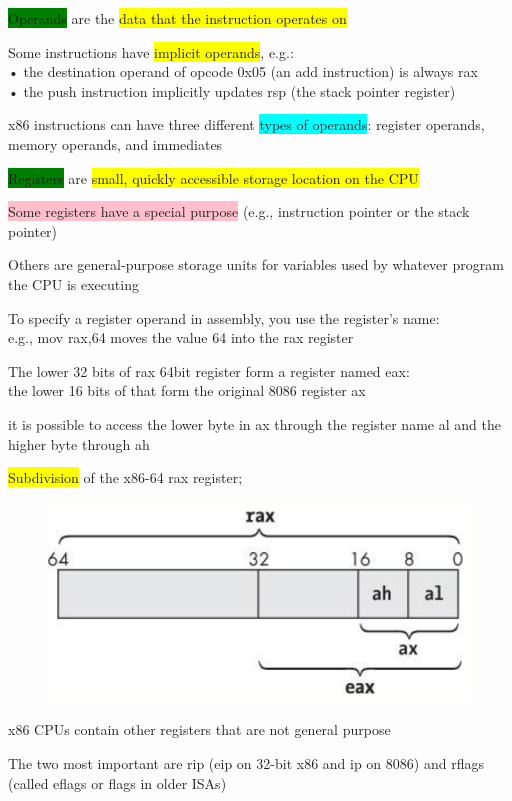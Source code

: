 \documentclass[]{project_plan}
\begin{document}
\colorbox{green}{Operands} are the \colorbox{yellow}{data that the instruction operates on}

Some instructions have \colorbox{yellow}{implicit operands}, e.g.:\\
• the destination operand of opcode 0x05 (an add instruction) is always rax\\
• the push instruction implicitly updates rsp (the stack pointer register)

x86 instructions can have three different \colorbox{cyan}{types of operands}: register operands, memory operands,
and immediates

\colorbox{green}{Registers} are \colorbox{yellow}{small, quickly accessible storage location on the CPU}

\colorbox{pink}{Some registers have a special purpose} (e.g., instruction pointer or the stack pointer)

Others are general-purpose storage units for variables used by whatever program the CPU is
executing

To specify a register operand in assembly, you use the register’s name:\\
e.g., mov rax,64 moves the value 64 into the rax register

The lower 32 bits of rax 64bit register form a register named eax:\\
the lower 16 bits of that form the original 8086 register ax

it is possible to access the lower byte in ax through the register name al and
the higher byte through ah

\colorbox{yellow}{Subdivision} of the x86-64 rax register;
\begin{figure}[H]
  \centering
  \includegraphics[width=.8\linewidth]{rax_register.png}
\end{figure}

x86 CPUs contain other registers that are not general purpose

The two most important are rip (eip on 32-bit x86 and ip on 8086) and rflags (called eflags or flags
in older ISAs)
\end{document}
